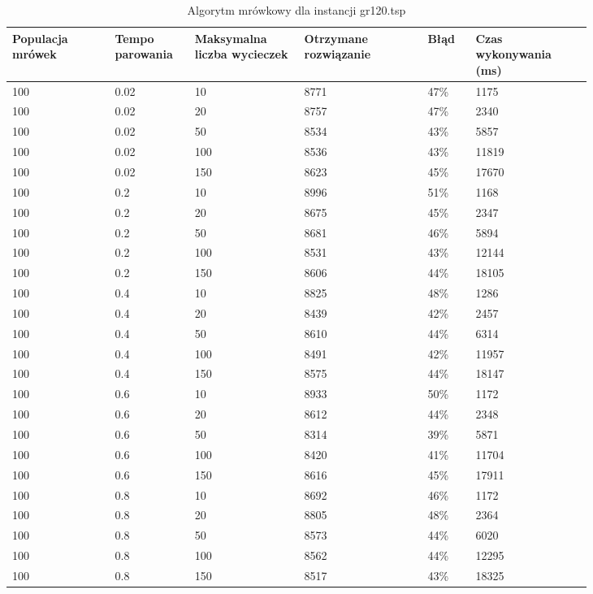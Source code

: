 \documentclass[12pt,a4paper,titlepage]{article}
\begin{document}
\begin{table}[H]
	\caption{Algorytm mrówkowy dla instancji gr120.tsp}
    \centering
	\begin{tabular}{|p{0.15\linewidth}|p{0.10\linewidth}|p{0.16\linewidth}|p{0.18\linewidth}|p{0.07\linewidth}|p{0.17\linewidth}|}
		\hline
        Populacja mrówek & Tempo parowania & Maksymalna liczba \newline wycieczek & Otrzymane rozwiązanie & Błąd & Czas \newline wykonywania (ms) \\
		\hline
        100 & 0.02 & 10 & 8771 & 47\% & 1175 \\
        100 & 0.02 & 20 & 8757 & 47\% & 2340 \\
        100 & 0.02 & 50 & 8534 & 43\% & 5857 \\
        100 & 0.02 & 100 & 8536 & 43\% & 11819 \\
        100 & 0.02 & 150 & 8623 & 45\% & 17670 \\
        \hline
        100 & 0.2 & 10 & 8996 & 51\% & 1168 \\
        100 & 0.2 & 20 & 8675 & 45\% & 2347 \\
        100 & 0.2 & 50 & 8681 & 46\% & 5894 \\
        100 & 0.2 & 100 & 8531 & 43\% & 12144 \\
        100 & 0.2 & 150 & 8606 & 44\% & 18105 \\
        \hline
        100 & 0.4 & 10 & 8825 & 48\% & 1286 \\
        100 & 0.4 & 20 & 8439 & 42\% & 2457 \\
        100 & 0.4 & 50 & 8610 & 44\% & 6314 \\
        100 & 0.4 & 100 & 8491 & 42\% & 11957 \\
        100 & 0.4 & 150 & 8575 & 44\% & 18147 \\
        \hline
        100 & 0.6 & 10 & 8933 & 50\% & 1172 \\
        100 & 0.6 & 20 & 8612 & 44\% & 2348 \\
        100 & 0.6 & 50 & 8314 & 39\% & 5871 \\
        100 & 0.6 & 100 & 8420 & 41\% & 11704 \\
        100 & 0.6 & 150 & 8616 & 45\% & 17911 \\
        \hline
        100 & 0.8 & 10 & 8692 & 46\% & 1172 \\
        100 & 0.8 & 20 & 8805 & 48\% & 2364 \\
        100 & 0.8 & 50 & 8573 & 44\% & 6020 \\
        100 & 0.8 & 100 & 8562 & 44\% & 12295 \\
        100 & 0.8 & 150 & 8517 & 43\% & 18325 \\
        \hline
    \end{tabular}
\end{table}
\end{document}
